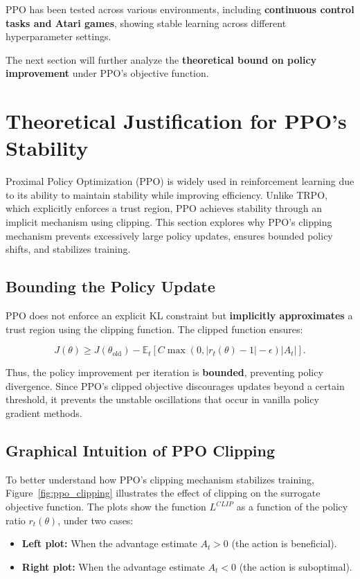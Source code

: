 \documentclass[12pt]{extreport} %
\begin{document}
PPO has been tested across various environments, including \textbf{continuous control tasks and Atari games}, showing stable learning across different hyperparameter settings.

The next section will further analyze the \textbf{theoretical bound on policy improvement} under PPO's objective function.


\section{Theoretical Justification for PPO's Stability}

Proximal Policy Optimization (PPO) is widely used in reinforcement learning due to its ability to maintain stability while improving efficiency. Unlike TRPO, which explicitly enforces a trust region, PPO achieves stability through an implicit mechanism using clipping. This section explores why PPO's clipping mechanism prevents excessively large policy updates, ensures bounded policy shifts, and stabilizes training.

\subsection{Bounding the Policy Update}

PPO does not enforce an explicit KL constraint but \textbf{implicitly approximates} a trust region using the clipping function. The clipped function ensures:

\begin{equation}
J(\theta) \geq J(\theta_{\text{old}}) - \mathbb{E}_t \left[ C \max(0, |r_t(\theta) - 1| - \epsilon) |A_t| \right].
\end{equation}

Thus, the policy improvement per iteration is \textbf{bounded}, preventing policy divergence. Since PPO's clipped objective discourages updates beyond a certain threshold, it prevents the unstable oscillations that occur in vanilla policy gradient methods.

\subsection{Graphical Intuition of PPO Clipping}

To better understand how PPO's clipping mechanism stabilizes training, Figure~\ref{fig:ppo_clipping} illustrates the effect of clipping on the surrogate objective function. The plots show the function $L^{CLIP}$ as a function of the policy ratio $r_t(\theta)$, under two cases:
\begin{itemize}
    \item \textbf{Left plot:} When the advantage estimate $A_t > 0$ (the action is beneficial).
    \item \textbf{Right plot:} When the advantage estimate $A_t < 0$ (the action is suboptimal).
\end{itemize}
\end{document}
